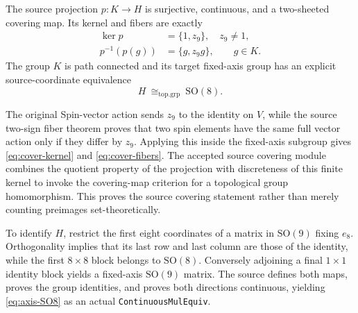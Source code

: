 \begin{sourceaccount}
\label{thm:axis-covering}
The source projection $p:K\to H$ is surjective, continuous, and a
two-sheeted covering map. Its kernel and fibers are exactly
\begin{align}
 \ker p &=\{1,z_9\},\quad z_9\ne1,\label{eq:cover-kernel}\\
 p^{-1}(p(g))&=\{g,z_9g\},\qquad g\in K.\label{eq:cover-fibers}
\end{align}
The group $K$ is path connected and its target fixed-axis group has an
explicit source-coordinate equivalence
\begin{equation}\label{eq:axis-SO8}
 H\ \cong_{\mathrm{top.grp}}\ \mathrm{SO}(8).
\end{equation}
\end{sourceaccount}
\begin{sourceexplanation}
The original Spin-vector action sends $z_9$ to the identity on $V$,
while the source two-sign fiber theorem proves that two spin elements
have the same full vector action only if they differ by $z_9$.
Applying this inside the fixed-axis subgroup gives
\eqref{eq:cover-kernel} and \eqref{eq:cover-fibers}.
The accepted source covering module combines the quotient property
of the projection with discreteness of this finite kernel to invoke
the covering-map criterion for a topological group homomorphism.
This proves the source covering statement rather than merely counting
preimages set-theoretically.

To identify $H$, restrict the first eight coordinates of a matrix in
$\mathrm{SO}(9)$ fixing $e_8$. Orthogonality implies that its last row
and last column are those of the identity, while the first $8\times8$
block belongs to $\mathrm{SO}(8)$. Conversely adjoining a final
$1\times1$ identity block yields a fixed-axis $\mathrm{SO}(9)$ matrix.
The source defines both maps, proves the group identities, and proves
both directions continuous, yielding \eqref{eq:axis-SO8} as an actual
\texttt{ContinuousMulEquiv}.
\end{sourceexplanation}

